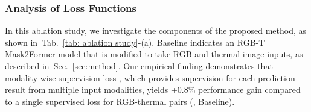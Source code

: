 \documentclass[10pt,twocolumn,letterpaper]{article}
\newcommand{\tabref}[1]{Tab.~\ref{#1}}
\newcommand{\secref}[1]{Sec.~\ref{#1}}
\begin{document}
\begin{table}[t]
\caption{\textbf{Ablation study of our proposed method on MF dataset~\cite{ha2017mfnet}.} 
We conduct an ablation study of the proposed method and various complementary masking strategies. Swin-S backbone is used for ablation study.}
\vspace{-0.2in}
\begin{center}

\end{center}
\vspace{-0.2in}
\label{tab: ablation study}
\end{table}



%
 

\subsubsection{Analysis of Loss Functions} 
In this ablation study, we investigate the components of the proposed method, as shown in~\tabref{tab: ablation study}-(a).
Baseline indicates an RGB-T Mask2Former model that is modified to take RGB and thermal image inputs, as described in~\secref{sec:method}.
Our empirical finding demonstrates that modality-wise supervision loss , which provides supervision for each prediction result from multiple input modalities, yields +0.8\% performance gain compared to a single supervised loss for RGB-thermal pairs (\ie, Baseline).
\end{document}
